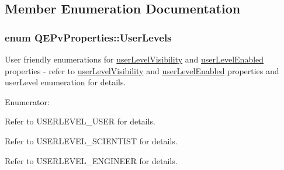 \subsection{Member Enumeration Documentation}
\hypertarget{classQEPvProperties_affb354a03ed5e2905586fad96fd9cb32}{
\subsubsection[{UserLevels}]{\setlength{\rightskip}{0pt plus 5cm}enum {\bf QEPvProperties::UserLevels}}}
\label{classQEPvProperties_affb354a03ed5e2905586fad96fd9cb32}
User friendly enumerations for \hyperlink{classQEPvProperties_ab298719b9ac151954f8ce9c9586f887f}{userLevelVisibility} and \hyperlink{classQEPvProperties_af97fe8a974987d11ba381862c9688797}{userLevelEnabled} properties -\/ refer to \hyperlink{classQEPvProperties_ab298719b9ac151954f8ce9c9586f887f}{userLevelVisibility} and \hyperlink{classQEPvProperties_af97fe8a974987d11ba381862c9688797}{userLevelEnabled} properties and userLevel enumeration for details. \begin{Desc}
\item[Enumerator: ]\par
\begin{description}
\item[{\em 
\hypertarget{classQEPvProperties_affb354a03ed5e2905586fad96fd9cb32af0eaf8d5415a4af7f36933ca2649589c}{
User}
\label{classQEPvProperties_affb354a03ed5e2905586fad96fd9cb32af0eaf8d5415a4af7f36933ca2649589c}
}]Refer to USERLEVEL\_\-USER for details. \item[{\em 
\hypertarget{classQEPvProperties_affb354a03ed5e2905586fad96fd9cb32ad3ac346d6d184fe430dd597cdb5878fa}{
Scientist}
\label{classQEPvProperties_affb354a03ed5e2905586fad96fd9cb32ad3ac346d6d184fe430dd597cdb5878fa}
}]Refer to USERLEVEL\_\-SCIENTIST for details. \item[{\em 
\hypertarget{classQEPvProperties_affb354a03ed5e2905586fad96fd9cb32a05ce75edc0221efb8d86aba47e4c09fb}{
Engineer}
\label{classQEPvProperties_affb354a03ed5e2905586fad96fd9cb32a05ce75edc0221efb8d86aba47e4c09fb}
}]Refer to USERLEVEL\_\-ENGINEER for details. \end{description}
\end{Desc}



